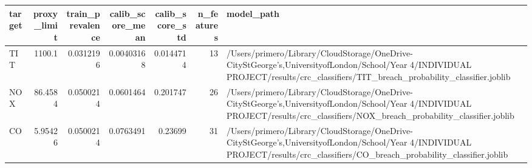 \begin{tabular}{lrrrrrl}
\toprule
target & proxy\_limit & train\_prevalence & calib\_score\_mean & calib\_score\_std & n\_features & model\_path \\
\midrule
TIT & 1100.1 & 0.0312196 & 0.00403168 & 0.0144714 & 13 & /Users/primero/Library/CloudStorage/OneDrive-CityStGeorge's,UniversityofLondon/School/Year 4/INDIVIDUAL PROJECT/results/crc\_classifiers/TIT\_breach\_probability\_classifier.joblib \\
NOX & 86.4584 & 0.0500214 & 0.0601464 & 0.201747 & 26 & /Users/primero/Library/CloudStorage/OneDrive-CityStGeorge's,UniversityofLondon/School/Year 4/INDIVIDUAL PROJECT/results/crc\_classifiers/NOX\_breach\_probability\_classifier.joblib \\
CO & 5.95426 & 0.0500214 & 0.0763491 & 0.23699 & 31 & /Users/primero/Library/CloudStorage/OneDrive-CityStGeorge's,UniversityofLondon/School/Year 4/INDIVIDUAL PROJECT/results/crc\_classifiers/CO\_breach\_probability\_classifier.joblib \\
\bottomrule
\end{tabular}
